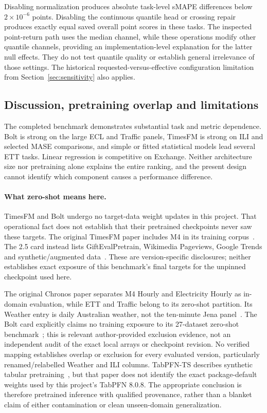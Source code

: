 Disabling normalization produces absolute task-level sMAPE differences below $2\times10^{-6}$ points. Disabling the continuous quantile head or crossing repair produces exactly equal saved overall point scores in these tasks. The inspected point-return path uses the median channel, while these operations modify other quantile channels, providing an implementation-level explanation for the latter null effects. They do not test quantile quality or establish general irrelevance of those settings. The historical requested-versus-effective configuration limitation from Section~\ref{sec:sensitivity} also applies.

\subsection{Discussion, pretraining overlap and limitations}\label{sec:limitations}
The completed benchmark demonstrates substantial task and metric dependence. Bolt is strong on the large ECL and Traffic panels, TimesFM is strong on ILI and selected MASE comparisons, and simple or fitted statistical models lead several ETT tasks. Linear regression is competitive on Exchange. Neither architecture size nor pretraining alone explains the entire ranking, and the present design cannot identify which component causes a performance difference.

\paragraph{What zero-shot means here.}
TimesFM and Bolt undergo no target-data weight updates in this project. That operational fact does not establish that their pretrained checkpoints never saw these targets. The original TimesFM paper includes M4 in its training corpus~\cite{timesfm_paper}. The 2.5 card instead lists GiftEvalPretrain, Wikimedia Pageviews, Google Trends and synthetic/augmented data~\cite{timesfm_card}. These are version-specific disclosures; neither establishes exact exposure of this benchmark's final targets for the unpinned checkpoint used here.

The original Chronos paper separates M4 Hourly and Electricity Hourly as in-domain evaluation, while ETT and Traffic belong to its zero-shot partition. Its Weather entry is daily Australian weather, not the ten-minute Jena panel~\cite{chronos_paper}. The Bolt card explicitly claims no training exposure to its 27-dataset zero-shot benchmark~\cite{chronos_bolt_card}; this is relevant author-provided exclusion evidence, not an independent audit of the exact local arrays or checkpoint revision. No verified mapping establishes overlap or exclusion for every evaluated version, particularly renamed/relabelled Weather and ILI columns. TabPFN-TS describes synthetic tabular pretraining~\cite{tabpfn_ts}, but that paper does not identify the exact package-default weights used by this project's TabPFN 8.0.8. The appropriate conclusion is therefore pretrained inference with qualified provenance, rather than a blanket claim of either contamination or clean unseen-domain generalization.

